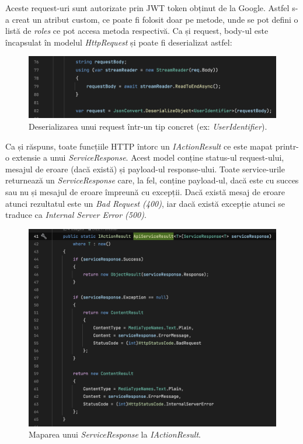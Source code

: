 Aceste request-uri sunt autorizate prin JWT token obținut de la Google. Astfel s-a creat un atribut custom,
ce poate fi folosit doar pe metode, unde se pot defini o listă de \textit{roles} ce pot
accesa metoda respectivă.
Ca și request, body-ul este încapsulat în modelul \textit{HttpRequest} și poate fi deserializat
astfel:
\begin{figure}[H]
    \centering
    \includegraphics[width=14cm]{Assets/DeserializeRequest.png}
    \caption{Deserializarea unui request într-un tip concret (ex: \textit{UserIdentifier}).}
    \label{fig:DeserializeRequest}
\end{figure}

Ca și răspuns, toate funcțiile HTTP întorc un \textit{IActionResult} ce este mapat printr-o extensie
a unui \textit{ServiceResponse}. Acest model conține status-ul request-ului, mesajul de eroare (dacă
există) și payload-ul response-ului. Toate service-urile returnează un \textit{ServiceResponse}
care, la fel, conține payload-ul, dacă este cu succes sau nu și mesajul de eroare împreună cu excepții.
Dacă există mesaj de eroare atunci rezultatul este un \textit{Bad Request (400)}, iar dacă există
excepție atunci se traduce ca \textit{Internal Server Error (500)}.

\begin{figure}[H]
    \centering
    \includegraphics[width=14cm]{Assets/HttpResponse.png}
    \caption{Maparea unui \textit{ServiceResponse} la \textit{IActionResult}.}
    \label{fig:HttpResponse}
\end{figure}

